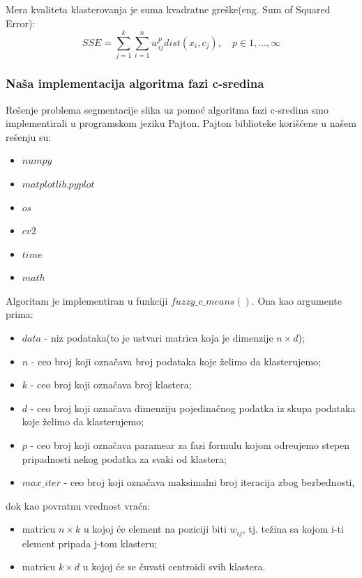 \documentclass{article}
\begin{document}
Mera kvaliteta klasterovanja je suma kvadratne gre\v{s}ke(eng. {\selectfont Sum of Squared Error}):
\begin{equation}
SSE = \sum_{j=1}^k\sum_{i=1}^n w_{ij}^p dist(x_i, c_j), \quad p \in 1,...,\infty
\end{equation}

\subsubsection{\selectfont Na\v{s}a implementacija algoritma fazi c-sredina}

Re\v{s}enje problema segmentacije slika uz pomo\'{c} algoritma fazi c-sredina smo implementirali u programskom jeziku Pajton. 
Pajton biblioteke kori\v{s}\'{c}ene u na\v{s}em re\v{s}enju su:
\begin{itemize}
\item $numpy$
\item $matplotlib.pyplot$
\item $os$
\item $cv2$
\item $time$
\item $math$
\end{itemize}
Algoritam je implementiran u funkciji $fuzzy\_c\_means()$. Ona kao argumente prima:
\begin{itemize}
\item $data$ - niz podataka(to je ustvari matrica koja je dimenzije $n \times d$);
\item $n$ - ceo broj koji ozna\v{c}ava broj podataka koje \v{z}elimo da klasterujemo;
\item $k$ - ceo broj koji ozna\v{c}ava broj klastera;
\item $d$ - ceo broj koji ozna\v{c}ava dimenziju pojedina\v{c}nog podatka iz skupa podataka koje \v{z}elimo da klasterujemo;
\item $p$ - ceo broj koji ozna\v{c}ava paramear za fazi formulu kojom odre\dj ujemo stepen pripadnosti nekog podatka za svaki od klastera;
\item $max\_iter$ - ceo broj koji ozna\v{c}ava maksimalni broj iteracija zbog bezbednosti,
\end{itemize}
dok kao povratnu vrednost vra\'{c}a:
\begin{itemize} 
\item matricu $n \times k$ u kojoj \'{c}e element na poziciji biti $w_{ij}$, tj. te\v{z}ina sa kojom {\selectfont i}-ti element pripada {\selectfont j}-tom klasteru;
\item matricu $k \times d$ u kojoj \'{c}e se \v{c}uvati centroidi svih klastera.
\end{itemize}
\end{document}
